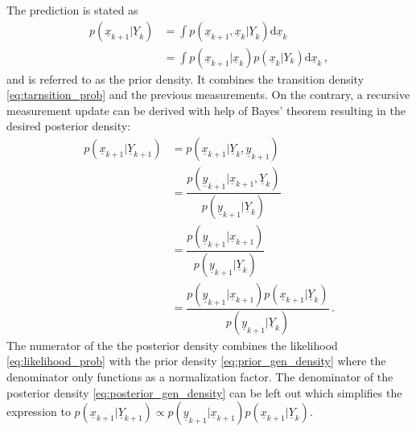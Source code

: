 \documentclass[a4paper]{IEEEtran}
\begin{document}
The prediction is stated as
\begin{equation}
    \begin{split}
        p(\underline{x}_{k+1} \vert \underline{Y}_{k}) &= \int p(\underline{x}_{k+1}, \underline{x}_{k} \vert \underline{Y}_{k}) \mathrm{d}\underline{x}_{k} \\
        &= \int p(\underline{x}_{k+1} \vert \underline{x}_{k})p(\underline{x}_{k} \vert Y_{k})\mathrm{d}\underline{x}_{k} \,,
    \end{split}
    \label{eq:prior_gen_density}
\end{equation}
and is referred to as the prior density. It combines the transition density \eqref{eq:tarnsition_prob} and the previous measurements.
On the contrary, a recursive measurement update can be derived with help of Bayes' theorem resulting in the desired posterior density:
\begin{equation}
    \begin{split}
        p(\underline{x}_{k+1} \vert \underline{Y}_{k+1}) &= p(\underline{x}_{k+1} \vert \underline{Y}_{k}, \underline{y}_{k+1}) \\
        &= \dfrac{p(\underline{y}_{k+1} \vert \underline{x}_{k+1}, \underline{Y}_{k})}{p(\underline{y}_{k+1} \vert \underline{Y}_{k})} \\
        &= \dfrac{p(\underline{y}_{k+1} \vert \underline{x}_{k+1})}{p(\underline{y}_{k+1} \vert \underline{Y}_{k})} \\
        &= \dfrac{p(\underline{y}_{k+1} \vert \underline{x}_{k+1}) p(\underline{x}_{k+1} \vert \underline{Y}_{k})}{p(\underline{y}_{k+1} \vert \underline{Y}_{k})} \,.  
        \label{eq:posterior_gen_density}
    \end{split}
\end{equation}
The numerator of the the posterior density combines the likelihood \eqref{eq:likelihood_prob} with the 
prior density \eqref{eq:prior_gen_density} where the denominator only functions as a normalization factor.
The denominator of the posterior density \eqref{eq:posterior_gen_density} can be left out which simplifies the expression to 
$ p(\underline{x}_{k+1} \vert \underline{Y}_{k+1}) \propto p(\underline{y}_{k+1} \vert \underline{x}_{k+1}) p(\underline{x}_{k+1} \vert \underline{Y}_{k})$.
\end{document}
